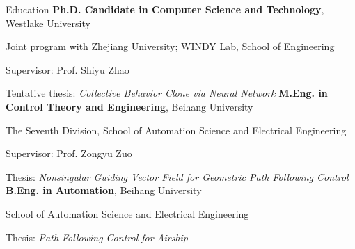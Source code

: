 \begin{rubric}{Education}
\entry*[2024 -- Present]%
	\textbf{Ph.D. Candidate in Computer Science and Technology}, Westlake University \par
	Joint program with Zhejiang University; WINDY Lab, School of Engineering \par
	Supervisor: Prof. Shiyu Zhao \par
	Tentative thesis: \emph{Collective Behavior Clone via Neural Network}
%
\entry*[2021 -- 2024]%
	\textbf{M.Eng. in Control Theory and Engineering}, Beihang University \par
	The Seventh Division, School of Automation Science and Electrical Engineering \par
	Supervisor: Prof. Zongyu Zuo \par
	Thesis: \emph{Nonsingular Guiding Vector Field for Geometric Path Following Control}
% 
\entry*[2017 -- 2021]%
	\textbf{B.Eng. in Automation}, Beihang University \par
	School of Automation Science and Electrical Engineering \par
	Thesis: \emph{Path Following Control for Airship}
\end{rubric}
